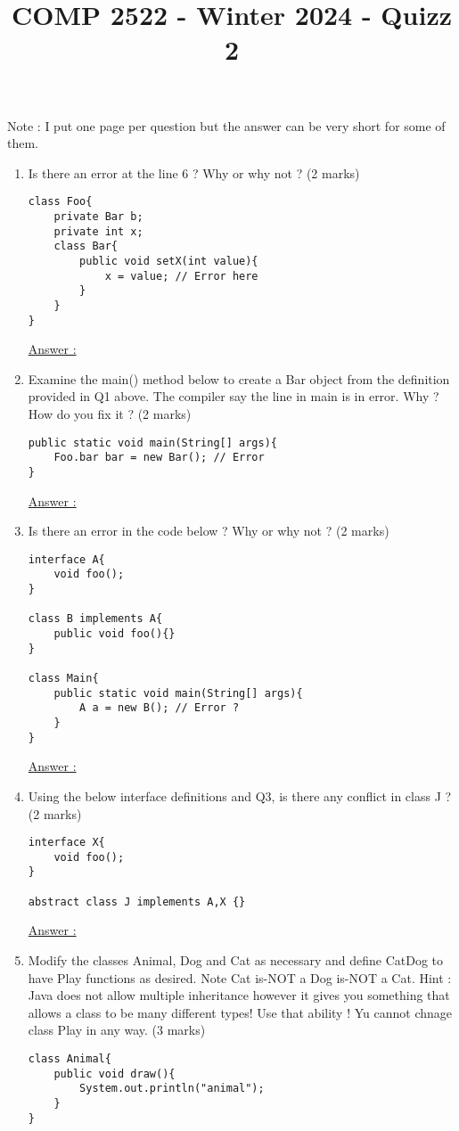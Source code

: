 \documentclass{article}
\author{}
\date{}
\title{COMP 2522 - Winter 2024 - Quizz 2}
\begin{document}
\maketitle

Note : I put one page per question but the answer can be very short for some of them.

\begin{enumerate}
	\item Is there an error at the line 6 ? Why or why not ? (2 marks)
	\begin{lstlisting}
class Foo{
	private Bar b;
	private int x;
	class Bar{
		public void setX(int value){
			x = value; // Error here
		}
	}
}
	\end{lstlisting}
	\underline{Answer :}
	\newpage
	\item Examine the main() method below to create a Bar object from the definition provided in Q1 above. The compiler say the line in main is in error. Why ? How do you fix it ? (2 marks)
	\begin{lstlisting}
public static void main(String[] args){
	Foo.bar bar = new Bar(); // Error
}
	\end{lstlisting}
	\underline{Answer :}
	\newpage
	\item Is there an error in the code below ? Why or why not ? (2 marks)
	\begin{lstlisting}
interface A{
	void foo();
}

class B implements A{
	public void foo(){}
}

class Main{
	public static void main(String[] args){
		A a = new B(); // Error ?	
	}
}
	\end{lstlisting}
	\underline{Answer :}
	\newpage
	\item Using the below interface definitions and Q3, is there any conflict in class J ? (2 marks)
	\begin{lstlisting}
interface X{
	void foo();
}

abstract class J implements A,X {}
	\end{lstlisting}
	\underline{Answer :}
	\newpage
	\item Modify the classes Animal, Dog and Cat as necessary and define CatDog to have Play functions as desired. Note Cat is-NOT a Dog is-NOT a Cat. Hint : Java does not allow multiple inheritance however it gives you something that allows a class to be many different types! Use that ability ! Yu cannot chnage class Play in any way. (3 marks)
	\begin{lstlisting}
class Animal{
	public void draw(){
		System.out.println("animal");
	}
}


\end{lstlisting}
\end{enumerate}
\end{document}
